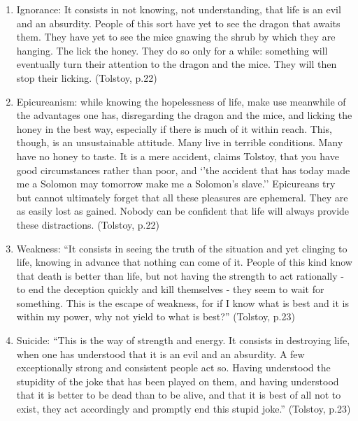 \documentclass[9pt]{article}
\begin{document}
\begin{enumerate}
\def\labelenumi{\arabic{enumi}.}
\item
  Ignorance: It consists in not knowing, not understanding, that life is
  an evil and an absurdity. People of this sort have yet to see the
  dragon that awaits them. They have yet to see the mice gnawing the
  shrub by which they are hanging. The lick the honey. They do so only
  for a while: something will eventually turn their attention to the
  dragon and the mice. They will then stop their licking. (Tolstoy,
  p.22)
\item
  Epicureanism: while knowing the hopelessness of life, make use
  meanwhile of the advantages one has, disregarding the dragon and the
  mice, and licking the honey in the best way, especially if there is
  much of it within reach. This, though, is an unsustainable attitude.
  Many live in terrible conditions. Many have no honey to taste. It is a
  mere accident, claims Tolstoy, that you have good circumstances rather
  than poor, and `'the accident that has today made me a Solomon may
  tomorrow make me a Solomon's slave.'' Epicureans try but cannot
  ultimately forget that all these pleasures are ephemeral. They are as
  easily lost as gained. Nobody can be confident that life will always
  provide these distractions. (Tolstoy, p.22)
\item
  Weakness: ``It consists in seeing the truth of the situation and yet
  clinging to life, knowing in advance that nothing can come of it.
  People of this kind know that death is better than life, but not
  having the strength to act rationally - to end the deception quickly
  and kill themselves - they seem to wait for something. This is the
  escape of weakness, for if I know what is best and it is within my
  power, why not yield to what is best?'' (Tolstoy, p.23)
\item
  Suicide: ``This is the way of strength and energy. It consists in
  destroying life, when one has understood that it is an evil and an
  absurdity. A few exceptionally strong and consistent people act so.
  Having understood the stupidity of the joke that has been played on
  them, and having understood that it is better to be dead than to be
  alive, and that it is best of all not to exist, they act accordingly
  and promptly end this stupid joke.'' (Tolstoy, p.23)
\end{enumerate}
\end{document}
